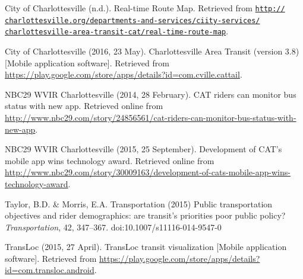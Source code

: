 \documentclass[12pt,letterpaper]{article}
\begin{document}
City of Charlottesville (n.d.). Real-time Route Map. Retrieved from \href{http://www.charlottesville.org/departments-and-services/city-services/charlottesville-area-transit-cat/real-time-route-map}{\tt http:// \\
charlottesville.org/departments-and-services/ciity-services/ \\
charlottesville-area-transit-cat/real-time-route-map}.

City of Charlottesville (2016, 23 May). Charlottesville Area Transit (version 3.8) [Mobile application software]. Retrieved from \url{https://play.google.com/store/apps/details?id=com.cville.cattail}.

NBC29 WVIR Charlottesville (2014, 28 February). CAT riders can monitor bus status with new app. Retrieved online from \url{http://www.nbc29.com/story/24856561/cat-riders-can-monitor-bus-status-with-new-app}.

NBC29 WVIR Charlottesville (2015, 25 September). Development of CAT's mobile app wins technology award. Retrieved online from \url{http://www.nbc29.com/story/30009163/development-of-cats-mobile-app-wins-technology-award}.

Taylor, B.D. \& Morris, E.A. Transportation (2015) Public transportation objectives and rider demographics:
are transit’s priorities poor public policy? \emph{Transportation}, 42, 347--367. doi:10.1007/s11116-014-9547-0

TransLoc (2015, 27 April). TransLoc transit visualization [Mobile application software]. Retrieved from \url{https://play.google.com/store/apps/details?id=com.transloc.android}.
\end{document}

